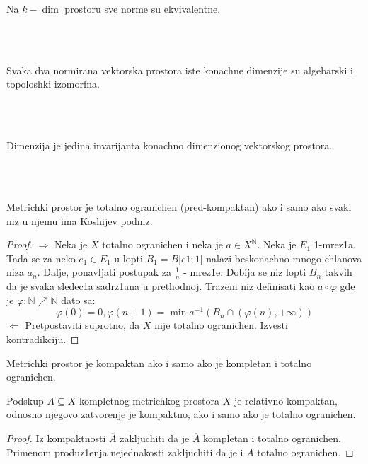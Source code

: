 \documentclass[a4paper,12pt]{article}
\newcommand{\NN}{\mathbb{N}}
\newcommand{\psj}{\subseteq}
\begin{document}
\begin{nap}
Na $k-\dim$ prostoru sve norme su ekvivalentne.
\end{nap}
\\ \\
\begin{posl}
Svaka dva normirana vektorska prostora iste konachne dimenzije su alge\-barski i topoloshki izomorfna.
\end{posl}
\\ \\
\begin{nap}
Dimenzija je jedina invarijanta konachno dimenzionog vektorskog prostora.
\end{nap}
\\ \\
\begin{tvr}
Metrichki prostor je totalno ogranichen (pred-kompaktan) ako i samo ako svaki niz u njemu ima Koshijev podniz.
\end{tvr}
\begin{proof}
$\boxed{\Rightarrow}$ Neka je $X$ totalno ogranichen i neka je $a \in X^{\NN}$. Neka je $E_1$ 1-mrez1a. Tada se za neko $e_1 \in E_1$ u lopti $B_1 = B]e1;1[$ nalazi beskonachno mnogo chlanova niza $a_n$. Dalje, ponavljati postupak za $\frac{1}{n}$ - mrez1e. Dobija se niz lopti $B_n$ takvih da je svaka sledec1a sadrz1ana u prethodnoj. Trazeni niz definisati kao $a \circ \varphi$ gde je $\varphi: \NN \nearrow \NN$ dato sa: \[\varphi(0) = 0, \varphi(n+1) = \min a^{-1} (B_n \cap (\varphi(n), + \infty))\]
$\boxed{\Leftarrow}$ Pretpostaviti suprotno, da $X$ nije totalno ogranichen. Izvesti kontradikciju.
\end{proof}

\begin{posl}
Metrichki prostor je kompaktan ako i samo ako je kompletan i totalno ogranichen.
\end{posl}

\begin{tvr}
Podskup $A \psj X$ kompletnog metrichkog prostora $X$ je relativno kompaktan, odnosno njegovo zatvorenje je kompaktno, ako i samo ako je totalno ogranichen.
\end{tvr}
\begin{proof}
Iz kompaktnosti $\overline{A}$ zakljuchiti da je $\overline{A}$ kompletan i totalno ogranichen. Primenom produz1enja nejednakosti zakljuchiti da je i $A$ totalno ogranichen.
\end{proof}
\end{document}
